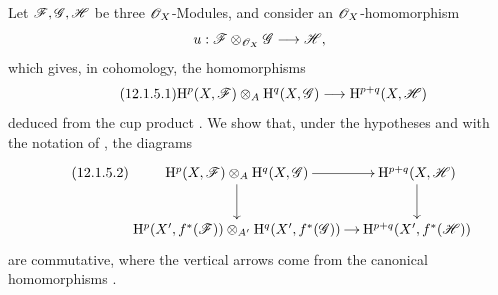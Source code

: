 \begin{env}[12.1.5]
\label{0.12.1.5}
Let $\mathscr{F},\mathscr{G},\mathscr{H}$ be three $\mathscr{O}_X$-Modules, and consider
an $\mathscr{O}_X$-homomorphism
\[
  u:\mathscr{F}\otimes_{\mathscr{O}_X}\mathscr{G}\longrightarrow\mathscr{H},
\]
which gives, in cohomology, the homomorphisms
\[
\label{0.12.1.5.1}
\tag{12.1.5.1}
  \mathrm{H}^p(X,\mathscr{F})\otimes_A\mathrm{H}^q(X,\mathscr{G})
  \longrightarrow
  \mathrm{H}^{p+q}(X,\mathscr{H})
\]
deduced from the cup product .
We show that, under the hypotheses and with the notation of
, the diagrams
\[
\label{0.12.1.5.2}
\tag{12.1.5.2}
  \xymatrix@C=10pt{
    \HH^p(X,\sh{F})\otimes_A\HH^q(X,\sh{G})
      \ar[r]\ar[d]
      & \HH^{p+q}(X,\sh{H})\ar[d]\\
    \HH^p(X',f^*(\sh{F}))\otimes_{A'}
      \HH^q(X',f^*(\sh{G}))
      \ar[r]
      & \HH^{p+q}(X',f^*(\sh{H}))
  }
\]
are commutative, where the vertical arrows come from the canonical
homomorphisms .


\end{env}
